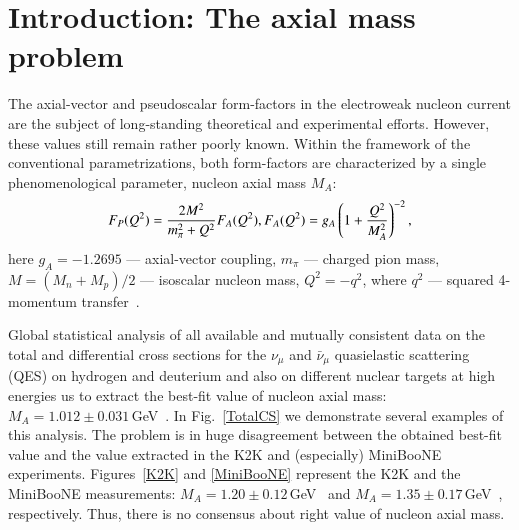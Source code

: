 \section{Introduction: The axial mass problem}
The axial-vector and pseudoscalar form-factors in the electroweak nucleon current are the subject of long-standing theoretical and experimental efforts. However, these values still remain rather poorly known. Within the framework of the conventional parametrizations, both form-factors are characterized by a single phenomenological parameter, nucleon axial mass $M_{A}$:
\begin{equation}
F_{P}(Q^{2})={}\frac{2M^{2}}{m_{\pi}^{2}+Q^{2}}F_{A}(Q^{2}),\\
F_{A}(Q^{2})={}g_{A}\left(1+\frac{Q^{2}}{M_{A}^{2}}\right)^{-2},
\end{equation}
here $g_{A}=-1.2695$ --- axial-vector coupling, $m_{\pi}$ --- charged pion mass, $M=(M_{n}+M_{p})/2$ --- isoscalar nucleon mass, $Q^{2}=-q^{2}$, where $q^{2}$ --- squared 4-momentum transfer~\cite{Kuzmin:2007kr}.

Global statistical analysis of all available and mutually consistent data on the total and differential cross sections for the $\nu_{\mu}$ and $\bar\nu_{\mu}$ quasielastic scattering (QES) on hydrogen and deuterium and also on different nuclear targets at high energies us to extract the best-fit value of nucleon axial mass: $M_{A}=1.012\pm0.031$\,GeV~\cite{Kuzmin:2014}. In Fig.~\ref{TotalCS} we demonstrate several examples of this analysis. The problem is in huge disagreement between the obtained best-fit value and the value extracted in the K2K and (especially) MiniBooNE experiments. Figures~\ref{K2K} and \ref{MiniBooNE} represent the K2K and the MiniBooNE measurements: $M_{A}=1.20\pm0.12$\,GeV~\cite{Gran:2006jn} and $M_{A}=1.35\pm0.17$\,GeV~\cite{AguilarArevalo:2010zc}, respectively. Thus, there is no consensus about right value of nucleon axial mass.

